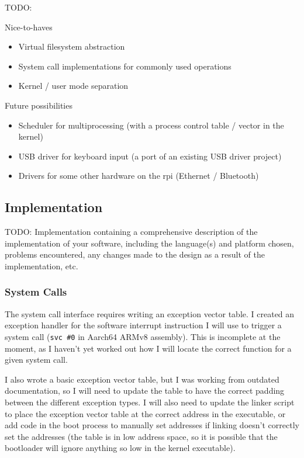 \documentclass{article}
\begin{document}
TODO:

Nice-to-haves
\begin{itemize}
    \item Virtual filesystem abstraction
    \item System call implementations for commonly used operations
    \item Kernel / user mode separation
\end{itemize}

Future possibilities
\begin{itemize}
    \item Scheduler for multiprocessing (with a process control table / vector
        in the kernel)
    \item USB driver for keyboard input (a port of an existing USB driver
        project)
    \item Drivers for some other hardware on the \gls{rpi} (Ethernet /
        Bluetooth)
\end{itemize}


\subsection{Implementation}
TODO: Implementation containing a comprehensive description of the
implementation of your software, including the language(s) and platform chosen,
problems encountered, any changes made to the design as a result of the
implementation, etc.

\subsubsection{System Calls}
\label{sec:impl_syscalls}
The system call interface requires writing an exception vector table. I created
an exception handler for the software interrupt instruction I will use to
trigger a system call (\texttt{svc \#0} in Aarch64 ARMv8 assembly). This is
incomplete at the moment, as I haven't yet worked out how I will locate the
correct function for a given system call.

I also wrote a basic exception vector table, but I was working from outdated
documentation, so I will need to update the table to have the correct padding
between the different exception types. I will also need to update the linker
script to place the exception vector table at the correct address in the
executable, or add code in the boot process to manually set addresses if
linking doesn't correctly set the addresses (the table is in low address space,
so it is possible that the bootloader will ignore anything so low in the kernel
executable).
\end{document}
